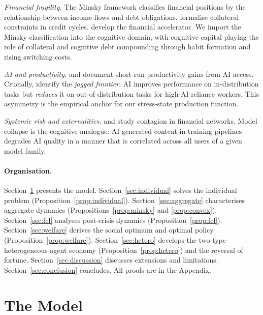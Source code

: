 \documentclass[12pt]{article}
\begin{document}
\textit{Financial fragility.} The Minsky framework \citep{Minsky1986} classifies
financial positions by the relationship between income flows and debt obligations.
\citet{KiyotakiMoore1997} formalise collateral constraints in credit cycles.
\citet{BernankeGertlerGilchrist1999} develop the financial accelerator.
We import the Minsky classification into the cognitive domain, with cognitive capital
playing the role of collateral and cognitive debt compounding through habit formation
and rising switching costs.

\textit{AI and productivity.} \citet{BrynjolfssonEtAl2025} and \citet{NoyZhang2023}
document short-run productivity gains from AI access. Crucially, \citet{DellAcquaEtAl2023}
identify the \emph{jagged frontier}: AI improves performance on in-distribution tasks
but \emph{reduces} it on out-of-distribution tasks for high-AI-reliance workers.
This asymmetry is the empirical anchor for our stress-state production function.

\textit{Systemic risk and externalities.} \citet{AllenGale2000} and
\citet{AcemogluEtAl2012} study contagion in financial networks. Model collapse
\citep{ShumailovEtAl2024} is the cognitive analogue: AI-generated content in training
pipelines degrades AI quality in a manner that is correlated across all users of a
given model family.

\paragraph{Organisation.} Section~\ref{sec:model} presents the model.
Section~\ref{sec:individual} solves the individual problem (Proposition~\ref{prop:individual}).
Section~\ref{sec:aggregate} characterises aggregate dynamics (Propositions~\ref{prop:minsky}
and \ref{prop:convex}).
Section~\ref{sec:fcl} analyses post-crisis dynamics (Proposition~\ref{prop:fcl}).
Section~\ref{sec:welfare} derives the social optimum and optimal policy
(Proposition~\ref{prop:welfare}).
Section~\ref{sec:hetero} develops the two-type heterogeneous-agent economy
(Proposition~\ref{prop:hetero}) and the reversal of fortune.
Section~\ref{sec:discussion} discusses extensions and limitations.
Section~\ref{sec:conclusion} concludes.
All proofs are in the Appendix.

\section{The Model}
\label{sec:model}
\end{document}
